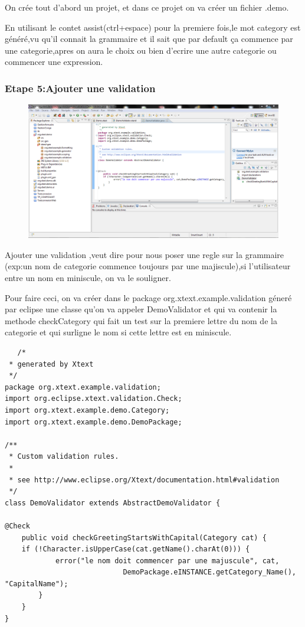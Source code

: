 \documentclass{article}
\begin{document}
On crée tout d'abord un projet, et dans ce projet on va créer un fichier .demo.

En utilisant le contet assist(ctrl+espace) pour la premiere fois,le mot category est généré,vu qu'il connait la grammaire et il sait que par default ça commence par une categorie,apres on aura le choix ou bien d'ecrire une autre categorie ou commencer une expression.


\subsubsection{Etape 5:Ajouter une validation}

\begin{figure}[h]
	\centering
		\includegraphics[width=1.10\textwidth]{5.PNG}
	\label{fig:5}
\end{figure}\FloatBarrier


Ajouter une validation ,veut dire pour nous poser une regle sur la grammaire (exp:un nom de categorie commence toujours par une majiscule),si l'utilisateur entre un nom en miniscule, on va le souligner.

Pour faire ceci, on va créer dans le package org.xtext.example.validation géneré par eclipse une classe qu'on va appeler DemoValidator et qui va contenir la methode checkCategory qui fait un test sur la premiere lettre du nom de la categorie et qui surligne le nom si cette lettre est en miniscule.

\begin{verbatim}
   /*
 * generated by Xtext
 */
package org.xtext.example.validation;
import org.eclipse.xtext.validation.Check;
import org.xtext.example.demo.Category;
import org.xtext.example.demo.DemoPackage;

/**
 * Custom validation rules. 
 *
 * see http://www.eclipse.org/Xtext/documentation.html#validation
 */
class DemoValidator extends AbstractDemoValidator {

@Check
	public void checkGreetingStartsWithCapital(Category cat) {
	if (!Character.isUpperCase(cat.getName().charAt(0))) {
			error("le nom doit commencer par une majuscule", cat,
							DemoPackage.eINSTANCE.getCategory_Name(), "CapitalName");
		}
	}
}
\end{verbatim}
\end{document}

